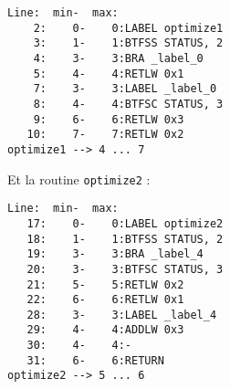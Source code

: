 \begin{lstlisting}[language=assembleur, frame=l]
 Line:  min-  max:
    2:    0-    0:LABEL optimize1
    3:    1-    1:BTFSS STATUS, 2
    4:    3-    3:BRA _label_0
    5:    4-    4:RETLW 0x1
    7:    3-    3:LABEL _label_0
    8:    4-    4:BTFSC STATUS, 3
    9:    6-    6:RETLW 0x3
   10:    7-    7:RETLW 0x2
optimize1 --> 4 ... 7
\end{lstlisting}


Et la routine \texttt{optimize2} :

\begin{lstlisting}[language=assembleur, frame=l]
 Line:  min-  max:
   17:    0-    0:LABEL optimize2
   18:    1-    1:BTFSS STATUS, 2
   19:    3-    3:BRA _label_4
   20:    3-    3:BTFSC STATUS, 3
   21:    5-    5:RETLW 0x2
   22:    6-    6:RETLW 0x1
   28:    3-    3:LABEL _label_4
   29:    4-    4:ADDLW 0x3
   30:    4-    4:-
   31:    6-    6:RETURN
optimize2 --> 5 ... 6
\end{lstlisting}


